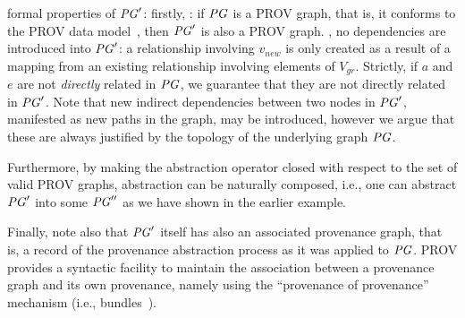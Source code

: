  formal properties of $\mathit{PG}'$: firstly, : if $\mathit{PG}$ is a  PROV graph, that is, it conforms to the PROV data model~\citep{w3c-prov-dm}, then $\mathit{PG}'$ is also a  PROV graph.
, no   dependencies are introduced into $\mathit{PG}'$: a  relationship involving $v_{new}$ is only created as a result of a mapping from an existing relationship involving elements of $V_{gr}$. Strictly, if $a$ and $e$ are not \textit{directly} related in $\mathit{PG}$, we guarantee that they are not directly related in $\mathit{PG}'$.  Note that new indirect dependencies between two nodes in $\mathit{PG}'$, manifested as new paths in the graph, may be introduced, however we argue that these are always justified by the topology of the underlying graph $\mathit{PG}$.

 



Furthermore, by making the abstraction operator closed with respect to the set of valid PROV graphs, abstraction can be naturally composed, i.e.,  one can abstract $\mathit{PG}'$ into some $\mathit{PG}''$ as we have shown in the earlier example.

%
Finally, note also that $\mathit{PG}'$ itself has also an associated provenance graph, that is, a record of the provenance abstraction process as it was applied to $\mathit{PG}$. 
PROV provides a syntactic facility to maintain the association between a provenance graph and its own provenance, namely using the ``provenance of provenance'' mechanism (i.e., bundles~\citep{w3c-prov-dm}).


